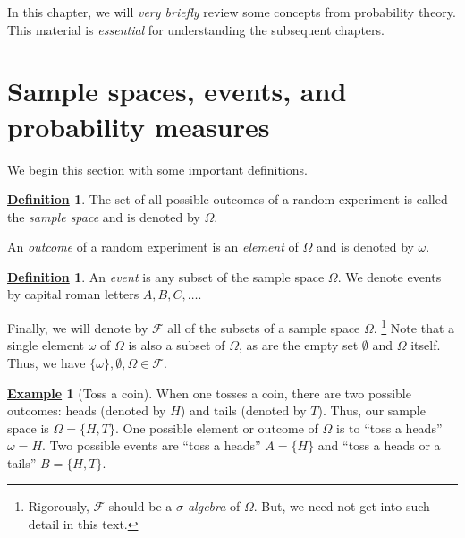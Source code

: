 \documentclass[12pt]{book}
\numberwithin{equation}{chapter}
\theoremstyle{plain}
\numberwithin{theorem}{section}
\theoremstyle{definition}
\newtheorem{definition}[theorem]{\underline{Definition}}
\newtheorem{example}[theorem]{\underline{Example}}
\numberwithin{exercise}{chapter}
\newcommand{\<}{\langle}
\renewcommand{\>}{\rangle}
\renewcommand{\(}{\left(}
\renewcommand{\)}{\right)}
\renewcommand{\[}{\left[}
\renewcommand{\]}{\right]}
\newcommand\Fc{\mathscr{F}}
\newcommand\om{\omega}
\newcommand\Om{\Omega}
\newcommand\sig{\sigma}
\theoremstyle{definition}
\numberwithin{question}{section}
\begin{document}
In this chapter, we will \textit{very briefly} review some concepts from probability theory.  This material is \textit{essential} for understanding the subsequent chapters.


\section{Sample spaces, events, and probability measures}

\noindent
We begin this section with some important definitions.

\begin{definition}
The set of all possible outcomes of a random experiment is called the \textit{sample space} and is denoted by $\Om$.
\end{definition}

\noindent An \textit{outcome} of a random experiment is an \textit{element} of $\Om$ and is denoted by $\om$.

\begin{definition}
An \textit{event} is any subset of the sample space $\Om$.  We denote events by capital roman letters $A, B, C, \ldots$.
\end{definition}

\noindent
Finally, we will denote by $\Fc$ all of the subsets of a sample space $\Om$.
\footnote{Rigorously, $\Fc$ should be a \textit{$\sig$-algebra} of $\Om$.  But, we need not get into such detail in this text.}
Note that a single element $\om$ of $\Om$ is also a subset of $\Om$, as are the empty set $\emptyset$ and $\Om$ itself.  Thus, we have $\{\om\}, \emptyset, \Om \in \Fc$.

\begin{example}[Toss a coin]
When one tosses a coin, there are two possible outcomes: heads (denoted by $H$) and tails (denoted by $T$).  Thus, our sample space is
$\Om = \{ H, T \}$.  One possible element or outcome of $\Om$ is to ``toss a heads'' $\om = H$.  Two possible events are ``toss a heads'' $A = \{H\}$ and ``toss a heads or a tails'' $B = \{ H , T \}$.
\end{example}
\end{document}
